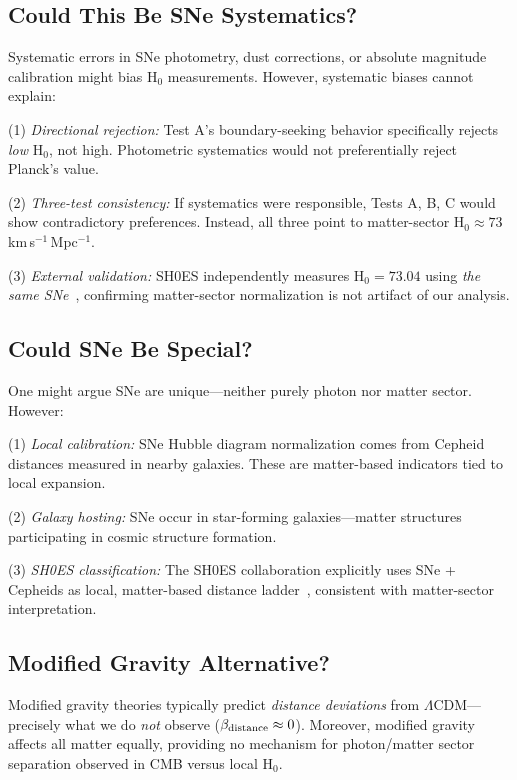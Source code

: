 \documentclass[twocolumn,superscriptaddress,prd,amsmath,amssymb]{revtex4-2}
\begin{document}
\subsection{Could This Be SNe Systematics?}

Systematic errors in SNe photometry, dust corrections, or absolute magnitude calibration might bias H$_0$ measurements. However, systematic biases cannot explain:

(1) \textit{Directional rejection:} Test A's boundary-seeking behavior specifically rejects \textit{low} H$_0$, not high. Photometric systematics would not preferentially reject Planck's value.

(2) \textit{Three-test consistency:} If systematics were responsible, Tests A, B, C would show contradictory preferences. Instead, all three point to matter-sector H$_0 \approx 73$ km\,s$^{-1}$\,Mpc$^{-1}$.

(3) \textit{External validation:} SH0ES independently measures H$_0 = 73.04$ using \textit{the same SNe}~\cite{Riess2022}, confirming matter-sector normalization is not artifact of our analysis.

\subsection{Could SNe Be Special?}

One might argue SNe are unique—neither purely photon nor matter sector. However:

(1) \textit{Local calibration:} SNe Hubble diagram normalization comes from Cepheid distances measured in nearby galaxies. These are matter-based indicators tied to local expansion.

(2) \textit{Galaxy hosting:} SNe occur in star-forming galaxies—matter structures participating in cosmic structure formation.

(3) \textit{SH0ES classification:} The SH0ES collaboration explicitly uses SNe + Cepheids as local, matter-based distance ladder~\cite{Riess2022}, consistent with matter-sector interpretation.

\subsection{Modified Gravity Alternative?}

Modified gravity theories typically predict \textit{distance deviations} from $\Lambda$CDM—precisely what we do \textit{not} observe ($\beta_{\rm distance} \approx 0$). Moreover, modified gravity affects all matter equally, providing no mechanism for photon/matter sector separation observed in CMB versus local H$_0$.
\end{document}
